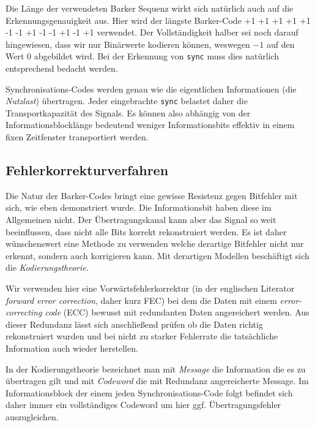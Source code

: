 Die Länge der verwendeten Barker Sequenz wirkt sich natürlich auch auf die Erkennungsgenauigkeit aus. Hier wird der längste Barker-Code \textsf{+1 +1 +1 +1 +1 -1 -1 +1 -1 -1 +1 -1 +1} verwendet. Der Vollständigkeit halber sei noch darauf hingewiesen, dass wir nur Binärwerte kodieren können, weswegen $-1$ auf den Wert $0$ abgebildet wird. Bei der Erkennung von \texttt{sync} muss dies natürlich entsprechend bedacht werden.

Synchronisations-Codes werden genau wie die eigentlichen Informationen (die \textit{Nutzlast}) übertragen. Jeder eingebrachte \texttt{sync} belastet daher die Transportkapazität des Signals. Es können also abhängig von der Informationsblocklänge bedeutend weniger Informationsbits effektiv in einem fixen Zeitfenster transportiert werden. 


\subsection{Fehlerkorrekturverfahren} 
\label{sec:errorcorrection}

Die Natur der Barker-Codes bringt eine gewisse Resistenz gegen Bitfehler mit sich, wie eben demonstriert wurde. Die Informationsbit haben diese im Allgemeinen nicht. Der Übertragungskanal kann aber das Signal so weit beeinflussen, dass nicht alle Bits korrekt rekonstruiert werden. Es ist daher wünschenswert eine Methode zu verwenden welche derartige Bitfehler nicht nur erkennt, sondern auch korrigieren kann. Mit derartigen Modellen beschäftigt sich die \textit{Kodierungstheorie}.

Wir verwenden hier eine Vorwärtsfehlerkorrektur (in der englischen Literator \textit{forward error correction}, daher kurz FEC) bei dem die Daten mit einem \textit{error-correcting code}  (ECC) bewusst mit redundanten Daten angereichert werden. Aus dieser Redundanz lässt sich anschließend prüfen ob die Daten richtig rekonstruiert wurden und bei nicht zu starker Fehlerrate die tatsächliche Information auch wieder herstellen. 

In der Kodierungstheorie bezeichnet man mit \textit{Message} die Information die es zu übertragen gilt und mit \textit{Codeword} die mit Redundanz angereicherte Message. Im Informationsblock der einem jeden Synchronisations-Code folgt befindet sich daher immer ein vollständiges Codeword um hier ggf. Übertragungsfehler auszugleichen. 

